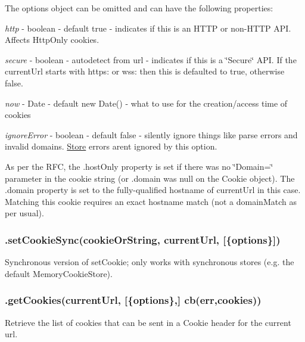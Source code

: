 The {\ttfamily options} object can be omitted and can have the following properties\+:


\begin{DoxyItemize}
\item {\itshape http} -\/ boolean -\/ default {\ttfamily true} -\/ indicates if this is an H\+T\+T\+P or non-\/\+H\+T\+T\+P A\+P\+I. Affects Http\+Only cookies.
\item {\itshape secure} -\/ boolean -\/ autodetect from url -\/ indicates if this is a \char`\"{}\+Secure\char`\"{} A\+P\+I. If the current\+Url starts with {\ttfamily https\+:} or {\ttfamily wss\+:} then this is defaulted to {\ttfamily true}, otherwise {\ttfamily false}.
\item {\itshape now} -\/ Date -\/ default {\ttfamily new Date()} -\/ what to use for the creation/access time of cookies
\item {\itshape ignore\+Error} -\/ boolean -\/ default {\ttfamily false} -\/ silently ignore things like parse errors and invalid domains. {\ttfamily \hyperlink{class_store}{Store}} errors aren\textquotesingle{}t ignored by this option.
\end{DoxyItemize}

As per the R\+F\+C, the {\ttfamily .host\+Only} property is set if there was no \char`\"{}\+Domain=\char`\"{} parameter in the cookie string (or {\ttfamily .domain} was null on the Cookie object). The {\ttfamily .domain} property is set to the fully-\/qualified hostname of {\ttfamily current\+Url} in this case. Matching this cookie requires an exact hostname match (not a {\ttfamily domain\+Match} as per usual).

\subsubsection*{{\ttfamily .set\+Cookie\+Sync(cookie\+Or\+String, current\+Url, \mbox{[}\{options\}\mbox{]})}}

Synchronous version of {\ttfamily set\+Cookie}; only works with synchronous stores (e.\+g. the default {\ttfamily Memory\+Cookie\+Store}).

\subsubsection*{{\ttfamily .get\+Cookies(current\+Url, \mbox{[}\{options\},\mbox{]} cb(err,cookies))}}

Retrieve the list of cookies that can be sent in a Cookie header for the current url.

